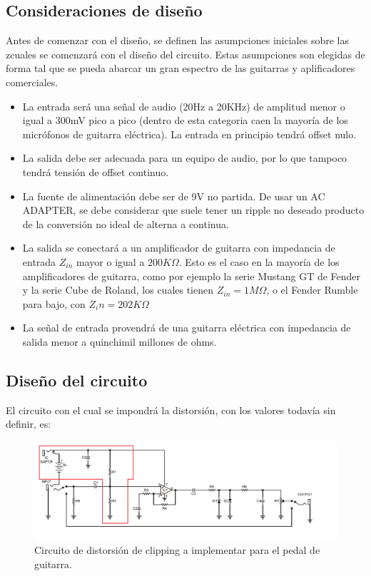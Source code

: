 \documentclass[../../main.tex]{subfiles}
\begin{document}
\subsection{Consideraciones de dise\~no} \label{ssec:ej5_consideraciones_disenio}
Antes de comenzar con el diseño, se definen las asumpciones iniciales sobre las zcuales se comenzará con el diseño del circuito. Estas asumpciones son elegidas de forma tal que se pueda abarcar un gran espectro de las guitarras y aplificadores comerciales.\par
\begin{itemize}
	\item La entrada ser\'a una señal de audio (20Hz a 20KHz) de amplitud menor o igual a 300mV pico a pico (dentro de esta categoria caen la mayor\'ia de los micr\'ofonos de guitarra el\'ectrica). La entrada en principio tendrá offset nulo.
	\item La salida debe ser adecuada para un equipo de audio, por lo que tampoco tendrá tensión de offset continuo.
	\item La fuente de alimentaci\'on debe ser de 9V no partida. De usar un AC ADAPTER, se debe considerar que suele tener un ripple no deseado producto de la conversi\'on no ideal de alterna a continua.
	\item La salida se conectar\'a a un amplificador de guitarra con impedancia de entrada $Z_{in}$ mayor o igual a $200K\Omega$. Esto es el caso en la mayor\'ia de los amplificadores de guitarra, como por ejemplo la serie Mustang GT de Fender y la serie Cube de Roland, los cuales tienen $Z_{in} = 1M\Omega$, o el Fender Rumble para bajo, con $Z_in = 202K\Omega$ 
	\item La se\~nal de entrada provendr\'a de una guitarra el\'ectrica con impedancia de salida menor a quinchimil millones de ohms.	
\end{itemize}


\subsection{Dise\~no del circuito}

El circuito con el cual se impondrá la distorsión, con los valores todavía sin definir, es:

\begin{figure}[H]	%
	\centering
	\includegraphics[scale=0.6]{imagenes/Circuito_consigna.png}
	\caption{Circuito de distorsión de clipping a implementar para el pedal de guitarra.}
	\label{fig:ej5_Circuito_consigna}
\end{figure}
\end{document}
